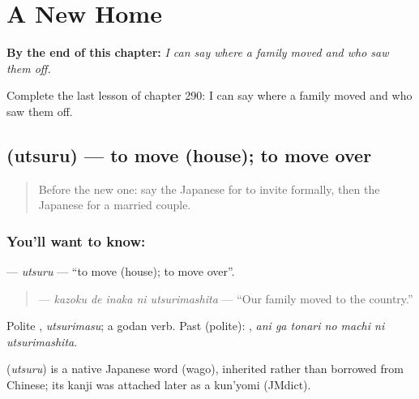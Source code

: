 
\chapter{A New Home}
\label{ch:ja-a-new-home}

\begin{chapteropening}
\textbf{By the end of this chapter:} \emph{I can say where a family moved and who saw them off.}

Complete the last lesson of chapter 290: I can say where a family moved and who saw them off.
\end{chapteropening}

\section[\texorpdfstring{\ja{うつる} (utsuru)}{うつる (utsuru)}]{ (utsuru) — to move (house); to move over}

\label{lesson:JA-C290-utsuru}



\begin{quote}
Before the new one: say the Japanese for to invite formally, then the Japanese for a married couple.
\end{quote}

\subsection*{You'll want to know: }
\textbf{} — \emph{utsuru} — \textquotedblleft{}to move (house); to move over\textquotedblright{}.

\begin{quote}
\textbf{  } — \emph{kazoku de inaka ni utsurimashita} — \textquotedblleft{}Our family moved to the country.\textquotedblright{}
\end{quote}

Polite \textbf{}, \emph{utsurimasu}; a godan verb. Past (polite): \textbf{   }, \emph{ani ga tonari no machi ni utsurimashita}.

\begin{cousinweb}
\textbf{} (\emph{utsuru}) is a native Japanese word (wago), inherited rather than borrowed from Chinese; its kanji was attached later as a kun'yomi (JMdict).
\end{cousinweb}

